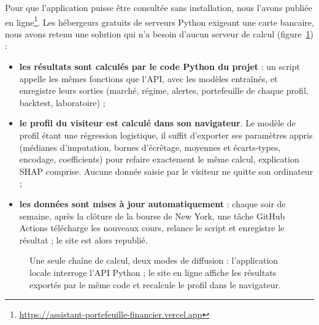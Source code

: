 Pour que l'application puisse être consultée sans installation, nous l'avons publiée en ligne\footnote{\url{https://assistant-portefeuille-financier.vercel.app}}. Les hébergeurs gratuits de serveurs Python exigeant une carte bancaire, nous avons retenu une solution qui n'a besoin d'aucun serveur de calcul (figure~\ref{fig:deploiement}) :
\begin{itemize}
  \item \textbf{les résultats sont calculés par le code Python du projet} : un script appelle les mêmes fonctions que l'API, avec les modèles entraînés, et enregistre leurs sorties (marché, régime, alertes, portefeuille de chaque profil, backtest, laboratoire) ;
  \item \textbf{le profil du visiteur est calculé dans son navigateur}. Le modèle de profil étant une régression logistique, il suffit d'exporter ses paramètres appris (médianes d'imputation, bornes d'écrêtage, moyennes et écarts-types, encodage, coefficients) pour refaire exactement le même calcul, explication SHAP comprise. Aucune donnée saisie par le visiteur ne quitte son ordinateur ;
  \item \textbf{les données sont mises à jour automatiquement} : chaque soir de semaine, après la clôture de la bourse de New York, une tâche GitHub Actions télécharge les nouveaux cours, relance le script et enregistre le résultat ; le site est alors republié.
\end{itemize}

\begin{figure}[!htb]
  \centering
  \caption{Une seule chaîne de calcul, deux modes de diffusion : l'application locale interroge l'API Python ; le site en ligne affiche les résultats exportés par le même code et recalcule le profil dans le navigateur.}
  \label{fig:deploiement}
\end{figure}

